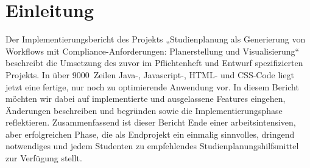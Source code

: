 \section{Einleitung}
Der Implementierungsbericht des Projekts „Studienplanung als Generierung von Workflows mit Compliance-Anforderungen: Planerstellung und Visualisierung“ beschreibt die Umsetzung des zuvor im Pflichtenheft und Entwurf spezifizierten Projekts. In über 9000~Zeilen Java-, Javascript-, HTML- und CSS-Code liegt jetzt eine fertige, nur noch zu optimierende Anwendung vor. In diesem Bericht möchten wir dabei auf implementierte und ausgelassene Features eingehen, Änderungen beschreiben und begründen sowie die Implementierungsphase reflektieren.
Zusammenfassend ist dieser Bericht Ende einer arbeitsintensiven, aber erfolgreichen Phase, die als Endprojekt ein einmalig sinnvolles, dringend notwendiges und jedem Studenten zu empfehlendes Studienplanungshilfsmittel zur Verfügung stellt.


